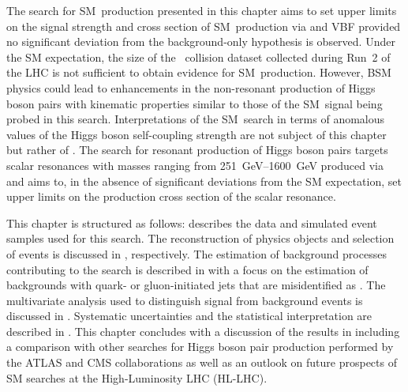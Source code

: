 The search for SM~\HH production presented in this chapter aims to set upper
limits on the signal strength and cross section of SM~\HH production via \ggF
and VBF provided no significant deviation from the background-only hypothesis is
observed. Under the SM expectation, the size of the \pp~collision dataset
collected during Run~2 of the LHC is not sufficient to obtain evidence for
SM~\HH production. However, BSM physics could lead to enhancements in the
non-resonant production of Higgs boson pairs with kinematic properties similar
to those of the SM~\HH signal being probed in this search. Interpretations of
the SM~\HH search in terms of anomalous values of the Higgs boson self-coupling
strength are not subject of this chapter but rather of
. The search for resonant production of Higgs
boson pairs targets scalar resonances with masses ranging from
\SIrange{251}{1600}{\GeV} produced via \ggF and aims to, in the absence of
significant deviations from the SM expectation, set upper limits on the
production cross section of the scalar resonance.

This chapter is structured as follows:  describes
the data and simulated event samples used for this search. The reconstruction of
physics objects and selection of events is discussed in
, respectively. The
estimation of background processes contributing to the search is described in
 with a focus on the estimation of backgrounds
with quark- or gluon-initiated jets that are misidentified as \tauhadvis. The
multivariate analysis used to distinguish signal from background events is
discussed in . Systematic uncertainties and the
statistical interpretation are described in
. This chapter concludes with a
discussion of the results in  including a comparison
with other searches for Higgs boson pair production performed by the ATLAS and
CMS collaborations as well as an outlook on future prospects of SM \HH searches
at the High-Luminosity LHC (HL-LHC).


